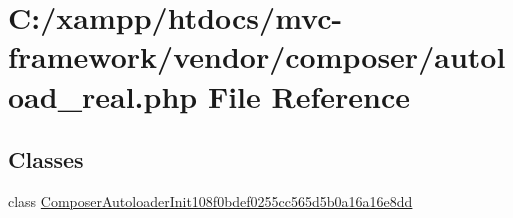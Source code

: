 \hypertarget{autoload__real_8php}{}\section{C\+:/xampp/htdocs/mvc-\/framework/vendor/composer/autoload\+\_\+real.php File Reference}
\label{autoload__real_8php}
\subsection*{Classes}
\begin{DoxyCompactItemize}
\item 
class \hyperlink{class_composer_autoloader_init108f0bdef0255cc565d5b0a16a16e8dd}{Composer\+Autoloader\+Init108f0bdef0255cc565d5b0a16a16e8dd}
\end{DoxyCompactItemize}
